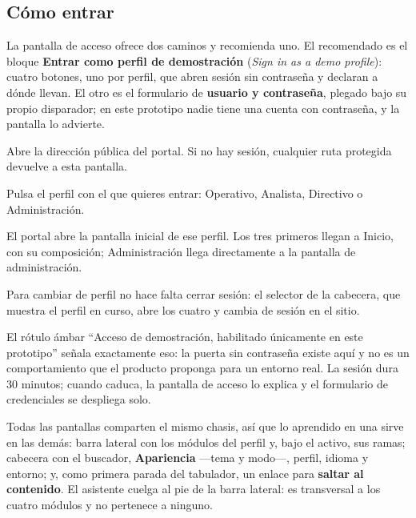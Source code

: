 \clearpage
\subsection{Cómo entrar}

La pantalla de acceso ofrece dos caminos y recomienda uno. El recomendado es el bloque
\textbf{Entrar como perfil de demostración} (\emph{Sign in as a demo profile}): cuatro botones, uno
por perfil, que abren sesión sin contraseña y declaran a dónde llevan. El otro es el formulario de
\textbf{usuario y contraseña}, plegado bajo su propio disparador; en este prototipo nadie tiene una
cuenta con contraseña, y la pantalla lo advierte.


\begin{uxpreg}
  \item Abre la dirección pública del portal. Si no hay sesión, cualquier ruta protegida devuelve
    a esta pantalla.
  \item Pulsa el perfil con el que quieres entrar: Operativo, Analista, Directivo o
    Administración.
  \item El portal abre la pantalla inicial de ese perfil. Los tres primeros llegan a Inicio, con
    su composición; Administración llega directamente a la pantalla de administración.
  \item Para cambiar de perfil no hace falta cerrar sesión: el selector de la cabecera, que
    muestra el perfil en curso, abre los cuatro y cambia de sesión en el sitio.
\end{uxpreg}

El rótulo ámbar \enquote{Acceso de demostración, habilitado únicamente en este prototipo} señala
exactamente eso: la puerta sin contraseña existe aquí y no es un comportamiento que el producto
proponga para un entorno real. La sesión dura 30 minutos; cuando caduca, la pantalla de acceso lo
explica y el formulario de credenciales se despliega solo.

Todas las pantallas comparten el mismo chasis, así que lo aprendido en una sirve en las demás:
barra lateral con los módulos del perfil y, bajo el activo, sus ramas; cabecera con el buscador,
\textbf{Apariencia} ---tema y modo---, perfil, idioma y entorno; y, como primera parada del
tabulador, un enlace para \textbf{saltar al contenido}. El asistente cuelga al pie de la barra
lateral: es transversal a los cuatro módulos y no pertenece a ninguno.

